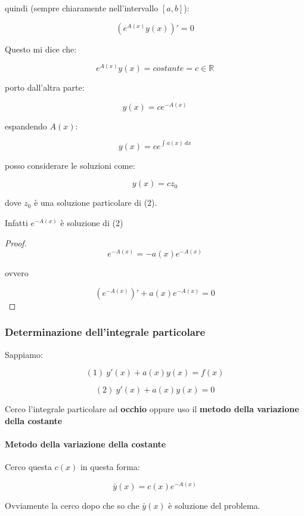 \documentclass[11pt]{article}
\begin{document}
quindi (sempre chiaramente nell'intervallo $[a,b]$):

\[
    (e ^{A(x)}y(x))'=0
\]

Questo mi dice che:

\[
    e ^{A(x)}y(x) = costante=c \in \mathbb{R}
\]

porto dall'altra parte:

\[
    y(x) = c e ^{-A(x)}
\]

espandendo $A(x)$:

\[
    y(x) = c e ^{\int_{{}}^{{}} {a(x)} \: d{x} {}}
\]

posso considerare le soluzioni come:

\[
    y(x) = c z_0
\]

dove $z_0$ è una soluzione particolare di (2).

Infatti $e ^{-A(x)}$ è soluzione di (2)

\begin{proof}
    \[
    e ^{-A(x)} = -a(x) e ^{-A(x)}
\]

ovvero

\[
    (e ^{-A(x)})'+a(x) e ^{-A(x)}=0
\]
    
\end{proof}


\subsubsection{Determinazione dell'integrale particolare}

Sappiamo:

\[
    (1)\ y'(x)+a(x)y(x)=f(x)
\]

\[
    (2)\ y'(x)+a(x)y(x)=0
\]

Cerco l'integrale particolare ad \textbf{occhio} oppure uso il \textbf{metodo della variazione della costante}

\paragraph{Metodo della variazione della costante}

Cerco questa $c(x)$ in questa forma:

\[
    \bar y(x) = c(x) e ^{-A(x)}
\]

Ovviamente la cerco dopo che so che $\bar y(x)$ è soluzione del problema.
\end{document}
